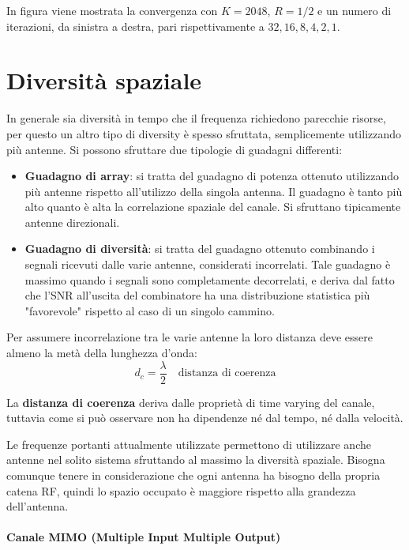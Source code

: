In figura viene mostrata la convergenza con $K=2048$, $R=1/2$ e un numero di iterazioni, da sinistra a destra, pari rispettivamente a $32, 16, 8, 4, 2, 1$.


\section*{Diversità spaziale}

In generale sia diversità in tempo che il frequenza richiedono parecchie risorse, per questo un altro tipo di diversity è spesso sfruttata, semplicemente utilizzando più antenne. Si possono sfruttare due tipologie di guadagni differenti:
\begin{itemize}
    \item \textbf{Guadagno di array}: si tratta del guadagno di potenza ottenuto utilizzando più antenne rispetto all'utilizzo della singola antenna. Il guadagno è tanto più alto quanto è alta la correlazione spaziale del canale. Si sfruttano tipicamente antenne direzionali.
    \item \textbf{Guadagno di diversità}: si tratta del guadagno ottenuto combinando i segnali ricevuti dalle varie antenne, considerati incorrelati. Tale guadagno è massimo quando i segnali sono completamente decorrelati, e deriva dal fatto che l'SNR all'uscita del combinatore ha una distribuzione statistica più "favorevole" rispetto al caso di un singolo cammino.
\end{itemize} 

Per assumere incorrelazione tra le varie antenne la loro distanza deve essere almeno la metà della lunghezza d'onda:
\[
    d_c = \frac{\lambda}{2} \quad \text{distanza di coerenza}
\]  

La \textbf{distanza di coerenza} deriva dalle proprietà di time varying del canale, tuttavia come si può osservare non ha dipendenze né dal tempo, né dalla velocità.

Le frequenze portanti attualmente utilizzate permettono di utilizzare anche antenne nel solito sistema sfruttando al massimo la diversità spaziale.
Bisogna comunque tenere in considerazione che ogni antenna ha bisogno della propria catena RF, quindi lo spazio occupato è maggiore rispetto alla grandezza dell'antenna.


\paragraph*{Canale MIMO (Multiple Input Multiple Output)}


